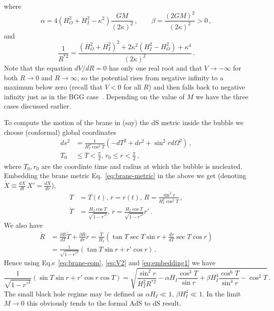 \documentclass[a4paper,11pt]{article}
\numberwithin{equation}{section}
\newcommand{\citep}{\cite}
\numberwithin{equation}{section}
\begin{document}
where 
\begin{equation}
\alpha=4\left(H_{O}^{2}+H_{I}^{2}-\kappa^{2}\right)\frac{GM}{\left(2\kappa\right)^{2}}\,, \qquad \beta=\frac{\left(2GM\right)^{2}}{\left(2\kappa\right)^{2}}>0 \,,\label{eq:alpha-beta}
\end{equation}
and
\begin{equation}
\frac{1}{R^{*2}}=\frac{\left(H_{O}^{2}+H_{I}^{2}\right)^{2}+2\kappa^{2}\left(H_{I}^{2}-H_{O}^{2}\right)+\kappa^{4}}{\left(2\kappa\right)^{2}}\,.\label{eq:R*}
\end{equation}
Note that the equation $dV/dR=0$ has only one real root and that
$V\rightarrow-\infty$ for both $R\rightarrow0$ and $R\rightarrow\infty$,
so the potential rises from negative infinity to a maximum below zero
(recall that $V<0$ for all $R$) and then falls back to negative
infinity just as in the BGG case~\citep{Blau:1986cw}. Depending on the value of $M$ we have the three cases discussed earlier.

To compute the motion of the brane in (say) the dS metric inside the
bubble we choose (conformal) global coordinates
\begin{align}
ds^{2} & =\frac{1}{H_{I}^{2}\cos^{2}T}\left(-dT^{2}+dr^{2}+\sin^{2}rd\Omega^{2}\right) \,,\label{eq:global-dS}\\
T_{0} & \le T<\frac{\pi}{2},\,r_{0}\le r<\frac{\pi}{2}\,,\nonumber 
\end{align}
where $T_{0},r_{0}$ are the coordinte time and radius at which the
bubble is nucleated. Embedding the brane metric Eq.~\eqref{eq:brane-metric} in the above we get (denoting $\dot{X}\equiv\frac{dX}{dt}\,X'=\frac{dX}{dr}$),
\begin{align}
T & =T(t),\,r=r(t),\,R=\frac{\sin^{2}r}{H_{I}^{2}\cos^{2}T} \,,\label{eq:embedding1}\\
\dot{T} & =\frac{H_{I}\cos T}{\sqrt{1-r'^{2}}},\,\dot{r}=\frac{H_{I}\cos T}{\sqrt{1-r'^{2}}}r' \,.\label{eq:embedding2}
\end{align}
We also have
\begin{align*}
\dot{R} & =\frac{\partial R}{dT}\dot{T}+\frac{\partial R}{dr}\dot{r}=\frac{\dot{T}}{H_{I}}\left(\tan T\sec T\sin r+\frac{dr}{dT}\sec T\cos r\right)\\
 & =\frac{1}{\sqrt{1-r'^{2}}}\left(\tan T\sin r+r'\cos r\right) \,.
\end{align*}
Hence using Eq.s~\eqref{eq:brane-eom}, \eqref{eq:V2} and \eqref{eq:embedding1}
we have 
\begin{equation}
\frac{1}{\sqrt{1-r'^{2}}}\left(\sin T\sin r+r'\cos r\cos T\right)=\sqrt{\frac{\sin^{2}r}{H_{I}^{2}R^{*2}}-\alpha H_{I}\frac{\cos^{3}T}{\sin r}+\beta H_{I}^{4}\frac{\cos^{6}T}{\sin^{4}r}-\cos^{2}T} \,.\label{eq:brane-eom2}
\end{equation}
The small black hole regime may be defined as $\alpha H_{I}\ll1,\,\beta H_{I}^{4}\ll1.$
In the limit $M\rightarrow0$ this obviously tends to the formal AdS
to dS result.
\end{document}

